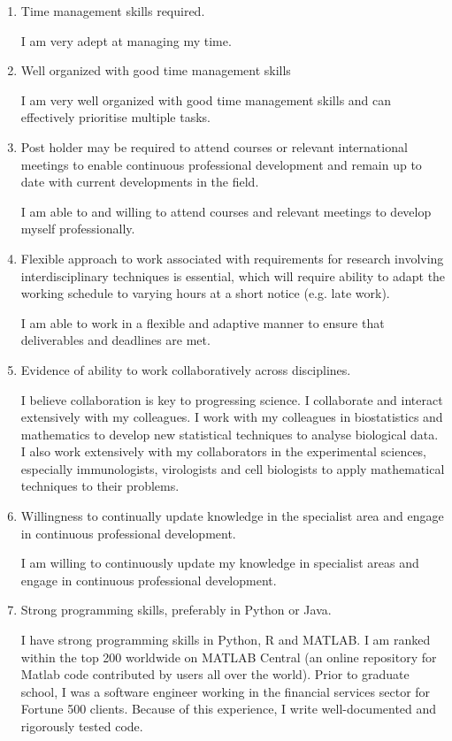 \documentclass[10pt]{article}
\begin{document}
\begin{enumerate}
\item Time management skills required.

I am very adept at managing my time.


\item  Well organized with good time management skills 

I am very well organized with good time management skills and can effectively prioritise multiple tasks.

\item Post holder may be required to attend courses or relevant international meetings to enable continuous professional development and remain up to date with current developments in the field.

I am able to and willing to attend courses and relevant meetings to develop myself professionally.


\item Flexible approach to work associated with requirements for research involving interdisciplinary techniques is essential, which will require ability to adapt the working schedule to varying hours at a short notice (e.g. late work).

I am able to work in a flexible and adaptive manner to ensure that deliverables and deadlines are met.




\item Evidence of ability to work collaboratively across disciplines.


I believe collaboration is key to progressing science. I collaborate and interact extensively with my colleagues. I work with my colleagues in biostatistics and mathematics to develop new statistical techniques to analyse biological data. I also work extensively with my collaborators in the experimental sciences, especially immunologists, virologists and cell biologists to apply mathematical techniques to their problems.


\item Willingness to continually update knowledge in the specialist area and engage in continuous professional development.

I am willing to continuously update my knowledge in specialist areas and engage in continuous professional development.


\item Strong programming skills, preferably in Python or Java.

I have strong programming skills in Python, R and MATLAB.
I am ranked within the top 200 worldwide on MATLAB Central (an online repository for Matlab code contributed by users all over the world). Prior to graduate school, I was a software engineer working in the financial services sector for Fortune 500 clients. Because of this experience, I write well-documented and rigorously tested code.


\end{enumerate}
\end{document}
